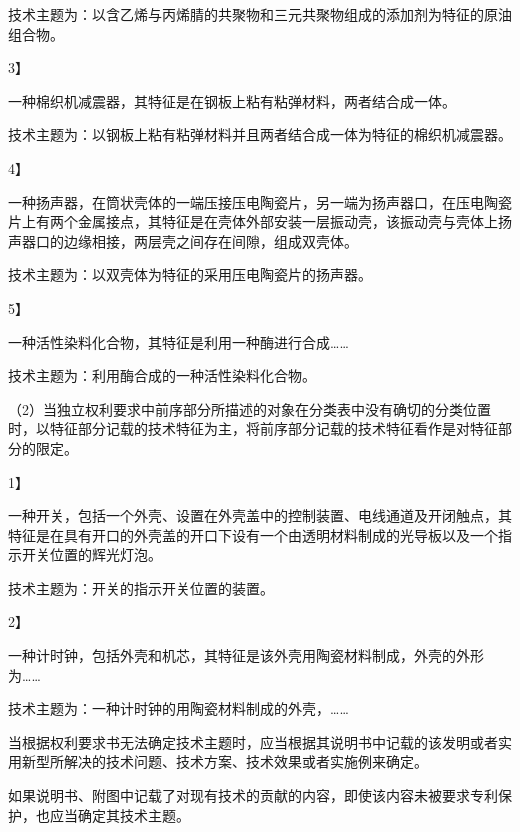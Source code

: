 技术主题为：以含乙烯与丙烯腈的共聚物和三元共聚物组成的添加剂为特征的原油组合物。

{3】\par}

一种棉织机减震器，其特征是在钢板上粘有粘弹材料，两者结合成一体。

技术主题为：以钢板上粘有粘弹材料并且两者结合成一体为特征的棉织机减震器。

{4】\par}

一种扬声器，在筒状壳体的一端压接压电陶瓷片，另一端为扬声器口，在压电陶瓷片上有两个金属接点，其特征是在壳体外部安装一层振动壳，该振动壳与壳体上扬声器口的边缘相接，两层壳之间存在间隙，组成双壳体。

技术主题为：以双壳体为特征的采用压电陶瓷片的扬声器。

{5】\par}

一种活性染料化合物，其特征是利用一种酶进行合成……

技术主题为：利用酶合成的一种活性染料化合物。

{\setlength{\parindent}{17.1bp}（2）当独立权利要求中前序部分所描述的对象在分类表中没有确切的分类位置时，以特征部分记载的技术特征为主，将前序部分记载的技术特征看作是对特征部分的限定。\par}

{1】\par}

一种开关，包括一个外壳、设置在外壳盖中的控制装置、电线通道及开闭触点，其特征是在具有开口的外壳盖的开口下设有一个由透明材料制成的光导板以及一个指示开关位置的辉光灯泡。

技术主题为：开关的指示开关位置的装置。

{2】\par}

一种计时钟，包括外壳和机芯，其特征是该外壳用陶瓷材料制成，外壳的外形为……

技术主题为：一种计时钟的用陶瓷材料制成的外壳，……

当根据权利要求书无法确定技术主题时，应当根据其说明书中记载的该发明或者实用新型所解决的技术问题、技术方案、技术效果或者实施例来确定。

如果说明书、附图中记载了对现有技术的贡献的内容，即使该内容未被要求专利保护，也应当确定其技术主题。

